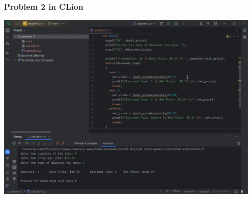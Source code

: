 \documentclass[a4paper,11pt]{article}
\theoremstyle{mytheor}
\theoremstyle{mytheor}
\begin{document}
\subsubsection{Problem 2 in CLion}
\includegraphics[width=1\linewidth]{prob-2.png}
\end{document}
